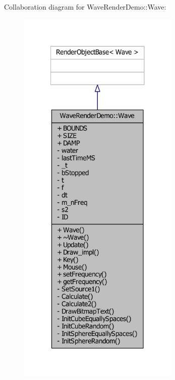Collaboration diagram for Wave\-Render\-Demo\-:\-:Wave\-:\nopagebreak
\begin{figure}[H]
\begin{center}
\leavevmode
\includegraphics[width=218pt]{de/dbe/classWaveRenderDemo_1_1Wave__coll__graph}
\end{center}
\end{figure}

